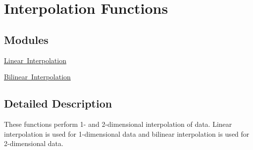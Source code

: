 \hypertarget{group__group_interpolation}{}\section{Interpolation Functions}
\label{group__group_interpolation}
\subsection*{Modules}
\begin{DoxyCompactItemize}
\item 
\mbox{\hyperlink{group___linear_interpolate}{Linear Interpolation}}
\item 
\mbox{\hyperlink{group___bilinear_interpolate}{Bilinear Interpolation}}
\end{DoxyCompactItemize}


\subsection{Detailed Description}
These functions perform 1-\/ and 2-\/dimensional interpolation of data. Linear interpolation is used for 1-\/dimensional data and bilinear interpolation is used for 2-\/dimensional data. 